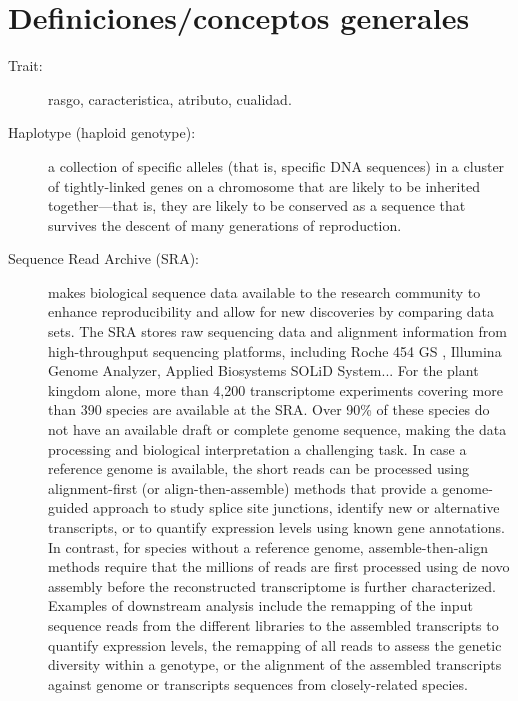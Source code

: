 \documentclass[a4paper,10pt]{article}
\begin{document}

% 

  
  
\section{Definiciones/conceptos generales}

\begin{description}


\item[Trait:] rasgo, caracteristica, atributo, cualidad.

\item[Haplotype (haploid genotype):] a collection of specific alleles (that is, specific DNA sequences) in a cluster of tightly-linked genes on a chromosome that are likely to be inherited together—that is, they are likely to be conserved as a sequence that survives the descent of many generations of reproduction.

\item[Sequence Read Archive (SRA):] makes biological sequence data available to the research community to enhance reproducibility and allow for new discoveries by comparing data sets. 
The SRA stores raw sequencing data and alignment information from high-throughput sequencing platforms, including Roche 454 GS , Illumina Genome Analyzer, Applied Biosystems SOLiD System... 
For the plant kingdom alone, more than 4,200 transcriptome experiments covering more than 390 species are available at the SRA. Over
90\% of these species do not have an available draft or complete genome sequence, making the data processing and biological interpretation a challenging task. 
In case a reference genome is available, the short reads can be processed using alignment-first (or align-then-assemble)
methods that provide a genome-guided approach to study splice site junctions, identify new or alternative transcripts, or to quantify expression levels using known gene annotations. In contrast, for species without a
reference genome, assemble-then-align methods require that the millions of reads are first processed using de novo assembly before the reconstructed transcriptome is further characterized. 
Examples of downstream analysis include the remapping of the input sequence reads from the different libraries to the assembled transcripts to quantify expression levels, the remapping of all reads
to assess the genetic diversity within a genotype, or the alignment of the assembled transcripts against genome or transcripts sequences from closely-related species.


\end{description}
\end{document}

